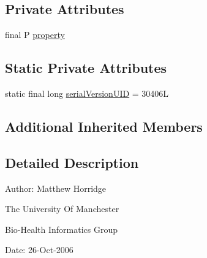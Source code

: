 \subsection*{Private Attributes}
\begin{DoxyCompactItemize}
\item 
final P \hyperlink{classuk_1_1ac_1_1manchester_1_1cs_1_1owl_1_1owlapi_1_1_o_w_l_unary_property_axiom_impl_3_01_p_01ef205cf0db3dbc15b2d1991298cd49c2_a3bd6535955e3be7c7a578387020bc32f}{property}
\end{DoxyCompactItemize}
\subsection*{Static Private Attributes}
\begin{DoxyCompactItemize}
\item 
static final long \hyperlink{classuk_1_1ac_1_1manchester_1_1cs_1_1owl_1_1owlapi_1_1_o_w_l_unary_property_axiom_impl_3_01_p_01ef205cf0db3dbc15b2d1991298cd49c2_af966f0cb6c54431b15bc9a1cc5fc42dc}{serial\-Version\-U\-I\-D} = 30406\-L
\end{DoxyCompactItemize}
\subsection*{Additional Inherited Members}


\subsection{Detailed Description}
Author\-: Matthew Horridge\par
 The University Of Manchester\par
 Bio-\/\-Health Informatics Group\par
 Date\-: 26-\/\-Oct-\/2006\par
\par
 

